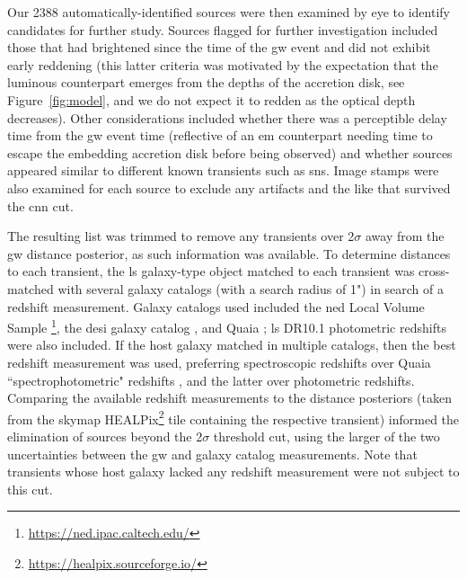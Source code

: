 \documentclass[twocolumn]{aastex631}
\begin{document}
Our 2388 automatically-identified sources were then examined by eye to identify candidates for further study.
Sources flagged for further investigation included those that had brightened since the time of the \gls{gw} event and did not exhibit early reddening (this latter criteria was motivated by the expectation that the luminous counterpart emerges from the depths of the accretion disk, see Figure~\ref{fig:model}, and we do not expect it to redden as the optical depth decreases).
Other considerations included whether there was a perceptible delay time from the \gls{gw} event time (reflective of an \gls{em} counterpart needing time to escape the embedding accretion disk before being observed) and whether sources appeared similar to different known transients such as \glspl{sn}.
Image stamps were also examined for each source to exclude any artifacts and the like that survived the \gls{cnn} cut.

The resulting list was trimmed to remove any transients over 2$\sigma$ away from the \gls{gw} distance posterior, as such information was available.
To determine distances to each transient, the \gls{ls} galaxy-type object matched to each transient was cross-matched with several galaxy catalogs (with a search radius of 1") in search of a redshift measurement.
Galaxy catalogs used included the \gls{ned} Local Volume Sample \citep{cook2023completeness} \footnote{\url{https://ned.ipac.caltech.edu/}}, the \gls{desi} galaxy catalog \citep{desiedr}, and Quaia \citep{storey-fisherQuaiaGaiaunWISEQuasar2024}; \gls{ls} DR10.1 photometric redshifts were also included.
If the host galaxy matched in multiple catalogs, then the best redshift measurement was used, preferring spectroscopic redshifts over Quaia ``spectrophotometric" redshifts \citep{storey-fisherQuaiaGaiaunWISEQuasar2024}, and the latter over photometric redshifts.
Comparing the available redshift measurements to the distance posteriors (taken from the skymap HEALPix\footnote{\url{https://healpix.sourceforge.io/}} tile containing the respective transient) informed the elimination of sources beyond the 2$\sigma$ threshold cut, using the larger of the two uncertainties between the \gls{gw} and galaxy catalog measurements.
Note that transients whose host galaxy lacked any redshift measurement were not subject to this cut.
\end{document}
